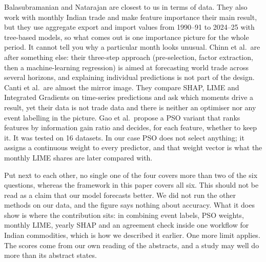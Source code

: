 \documentclass[pdftex,sn-mathphys-num]{sn-jnl}
\begin{document}
Balasubramanian and Natarajan are closest to us in terms of data. They also work with monthly Indian trade and make feature importance their main result, but they use aggregate export and import values from 1990--91 to 2024--25 with tree-based models, so what comes out is one importance picture for the whole period. It cannot tell you why a particular month looks unusual. Chinn et al.\ are after something else: their three-step approach (pre-selection, factor extraction, then a machine-learning regression) is aimed at forecasting world trade across several horizons, and explaining individual predictions is not part of the design. Canti et al.\ are almost the mirror image. They compare SHAP, LIME and Integrated Gradients on time-series predictions and ask which moments drive a result, yet their data is not trade data and there is neither an optimiser nor any event labelling in the picture. Gao et al.\ propose a PSO variant that ranks features by information gain ratio and decides, for each feature, whether to keep it. It was tested on 16 datasets. In our case PSO does not select anything; it assigns a continuous weight to every predictor, and that weight vector is what the monthly LIME shares are later compared with.

Put next to each other, no single one of the four covers more than two of the six questions, whereas the framework in this paper covers all six. This should not be read as a claim that our model forecasts better. We did not run the other methods on our data, and the figure says nothing about accuracy. What it does show is where the contribution sits: in combining event labels, PSO weights, monthly LIME, yearly SHAP and an agreement check inside one workflow for Indian commodities, which is how we described it earlier. One more limit applies. The scores come from our own reading of the abstracts, and a study may well do more than its abstract states.

\FloatBarrier

\clearpage
\end{document}
